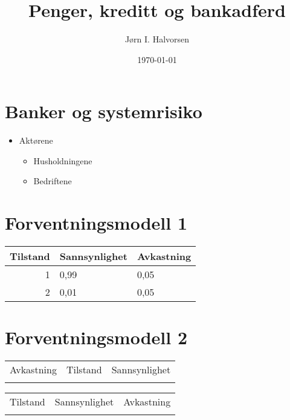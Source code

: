 \documentclass{article}
\author{Jørn I. Halvorsen}
\date{\today}
\title{Penger, kreditt og bankadferd}
\begin{document}
\maketitle



\section*{Banker og systemrisiko}
\label{sec-1}
\begin{itemize}
\item Aktørene
\label{sec-1-1}
\begin{itemize}
\item Husholdningene
\label{sec-1-1-1}
\item Bedriftene
\label{sec-1-1-2}
\end{itemize}
\end{itemize}
\section*{Forventningsmodell 1}
\label{sec-2}
\begin{center}
\begin{tabular}{rll}
Tilstand & Sannsynlighet & Avkastning\\
\hline
1 & 0,99 & 0,05\\
2 & 0,01 & 0,05\\
\end{tabular}
\end{center}


\section*{Forventningsmodell 2}
\label{sec-3}
\begin{center}
\begin{tabular}{lll}
Avkastning & Tilstand & Sannsynlighet\\
 &  & \\
\end{tabular}
\end{center}


\begin{center}
\begin{tabular}{lll}
Tilstand & Sannsynlighet & Avkastning\\
 &  & \\
\end{tabular}
\end{center}
\end{document}
